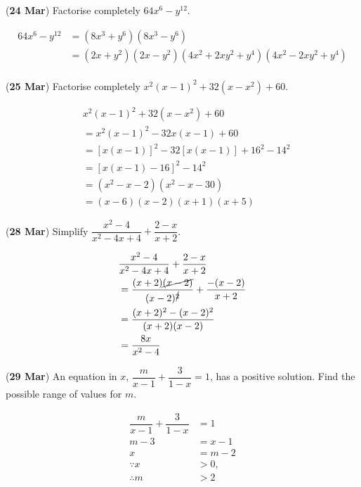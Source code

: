 \documentclass[12pt, answers]{exam}
\begin{document}
\begin{questions}
	\question (\textbf{24 Mar}) Factorise completely
	\(64x^6 - y^{12}\).
	\begin{solution}
		\begin{align*}
			64x^6 - y^{12} & = (8x^3 + y^6)(8x^3 - y^6)                                     \\
			               & = (2x + y^2)(2x - y^2)(4x^2 + 2xy^2 + y^4)(4x^2 - 2xy^2 + y^4) \\
		\end{align*}
	\end{solution}

	\question (\textbf{25 Mar}) Factorise completely
	\(x^2(x-1)^2 + 32(x-x^2) + 60\).
	\begin{solution}
		\begin{align*}
			 & x^2(x-1)^2 + 32(x-x^2) + 60             \\
			 & = x^2(x-1)^2 - 32x(x-1) + 60            \\
			 & = [x(x-1)]^2 - 32[x(x-1)] + 16^2 - 14^2 \\
			 & = [x(x-1) - 16]^2 - 14^2                \\
			 & = (x^2-x-2)(x^2-x-30)                   \\
			 & = (x-6)(x-2)(x+1)(x+5)
		\end{align*}
	\end{solution}

	\question (\textbf{28 Mar}) Simplify
	\(\dfrac{x^2-4}{x^2-4x+4}+\dfrac{2-x}{x+2}\).
	\begin{solution}
		\begin{align*}
			 & \dfrac{x^2-4}{x^2-4x+4} + \dfrac{2-x}{x+2}                              \\
			 & = \dfrac{(x+2)\cancel{(x-2)}}{(x-2)^{\cancel{2}}} + \dfrac{-(x-2)}{x+2} \\
			 & = \dfrac{(x+2)^2 - (x-2)^2}{(x+2)(x-2)}                                 \\
			 & = \dfrac{8x}{x^2 - 4}
		\end{align*}
	\end{solution}

	\question (\textbf{29 Mar}) An equation in \(x\),
	\(\dfrac{m}{x-1} + \dfrac{3}{1-x} = 1\), has a positive solution.
	Find the possible range of values for \(m\).
	\begin{solution}
		\begin{align*}
			\dfrac{m}{x-1} + \dfrac{3}{1-x} & = 1     \\
			m - 3                           & = x - 1 \\
			x                               & = m - 2 \\
			\because x                      & > 0,    \\
			\therefore m                    & >2      \\
		\end{align*}
	\end{solution}


\end{questions}
\end{document}

